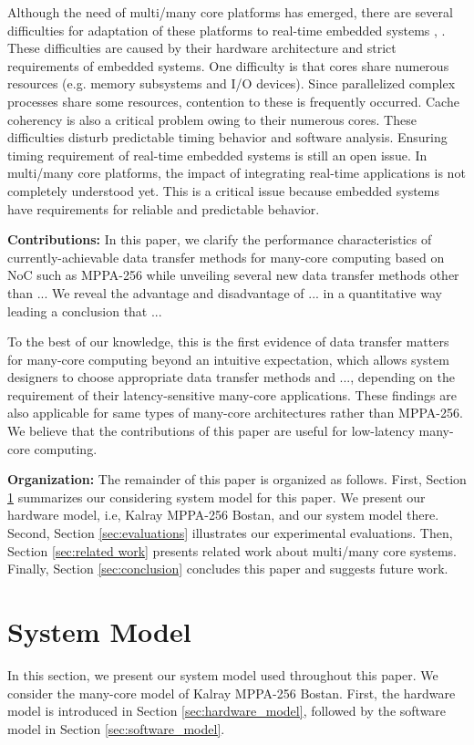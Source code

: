 \documentclass{sig-alternate-05-2015}
\begin{document}
Although the need of multi/many core platforms has emerged, there are several difficulties for adaptation of these platforms to real-time embedded systems \cite{becker2016contention}, \cite{saidi2015shift}.
These difficulties are caused by their hardware architecture and strict requirements of embedded systems.
One difficulty is that cores share numerous resources (e.g. memory subsystems and I/O devices).
Since parallelized complex processes share some resources, contention to these is frequently occurred.
Cache coherency is also a critical problem owing to their numerous cores.
These difficulties disturb predictable timing behavior and software analysis.
Ensuring timing requirement of real-time embedded systems is still an open issue.
In multi/many core platforms, the impact of integrating real-time applications is not completely understood yet.
This is a critical issue because embedded systems have requirements for reliable and predictable behavior.

\textbf{Contributions:}
In this paper, we clarify the performance characteristics of currently-achievable data transfer methods for many-core computing based on NoC such as MPPA-256
while unveiling several new data transfer methods other than ... %
We reveal the advantage and disadvantage of ... in a quantitative way leading a conclusion that ... %

To the best of our knowledge, this is the first evidence of data transfer matters for many-core computing beyond an intuitive expectation,
which allows system designers to choose appropriate data transfer methods and ..., %
depending on the requirement of their latency-sensitive many-core applications.
These findings are also applicable for same types of many-core architectures rather than MPPA-256.
We believe that the contributions of this paper are useful for low-latency many-core computing.

\textbf{Organization:}
The remainder of this paper is organized as follows.
First, Section \ref{sec:system_model} summarizes our considering system model for this paper.
We present our hardware model, i.e, Kalray MPPA-256 Bostan, and our system model there.
Second, Section \ref{sec:evaluations} illustrates our experimental evaluations.
Then, Section \ref{sec:related work} presents related work about multi/many core systems.
Finally, Section \ref{sec:conclusion} concludes this paper and suggests future work.


\section{System Model}
\label{sec:system_model}
In this section, we present our system model used throughout this paper.
We consider the many-core model of Kalray MPPA-256 Bostan.
First, the hardware model is introduced in Section \ref{sec:hardware_model},
followed by the software model in Section \ref{sec:software_model}.
\end{document}

